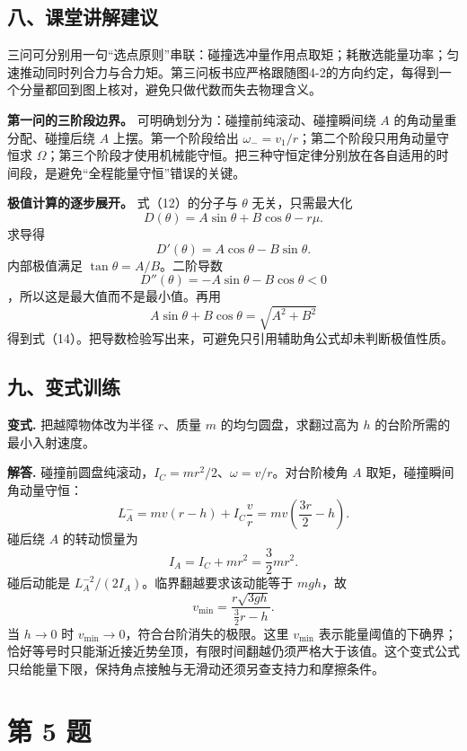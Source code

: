 \documentclass[12pt,a4paper,UTF8]{ctexart}
\begin{document}
\subsection{八、课堂讲解建议}\label{ux516bux8bfeux5802ux8bb2ux89e3ux5efaux8bae-3}

三问可分别用一句``选点原则''串联：碰撞选冲量作用点取矩；耗散选能量功率；匀速推动同时列合力与合力矩。第三问板书应严格跟随图4-2的方向约定，每得到一个分量都回到图上核对，避免只做代数而失去物理含义。

\textbf{第一问的三阶段边界。} 可明确划分为：碰撞前纯滚动、碰撞瞬间绕
\(A\) 的角动量重分配、碰撞后绕 \(A\) 上摆。第一个阶段给出
\(\omega_-=v_1/r\)；第二个阶段只用角动量守恒求
\(\Omega\)；第三个阶段才使用机械能守恒。把三种守恒定律分别放在各自适用的时间段，是避免``全程能量守恒''错误的关键。

\textbf{极值计算的逐步展开。} 式（12）的分子与 \(\theta\)
无关，只需最大化 \[
D(\theta)=A\sin\theta+B\cos\theta-r\mu.
\] 求导得 \[
D'(\theta)=A\cos\theta-B\sin\theta.
\] 内部极值满足 \(\tan\theta=A/B\)。二阶导数 \[
D''(\theta)=-A\sin\theta-B\cos\theta<0
\] ，所以这是最大值而不是最小值。再用 \[
A\sin\theta+B\cos\theta
=\sqrt{A^2+B^2}
\]
得到式（14）。把导数检验写出来，可避免只引用辅助角公式却未判断极值性质。

\subsection{九、变式训练}\label{ux4e5dux53d8ux5f0fux8badux7ec3-3}

\textbf{变式.} 把越障物体改为半径 \(r\)、质量 \(m\)
的均匀圆盘，求翻过高为 \(h\) 的台阶所需的最小入射速度。

\textbf{解答.}
碰撞前圆盘纯滚动，\(I_C=mr^2/2\)、\(\omega=v/r\)。对台阶棱角 \(A\)
取矩，碰撞瞬间角动量守恒： \[
L_A^-=mv(r-h)+I_C\frac vr
=mv\left(\frac{3r}{2}-h\right).
\] 碰后绕 \(A\) 的转动惯量为 \[
I_A=I_C+mr^2=\frac32mr^2.
\] 碰后动能是 \(L_A^{-2}/(2I_A)\)。临界翻越要求该动能等于 \(mgh\)，故 \[
\boxed{v_{\min}=
\frac{r\sqrt{3gh}}{\frac32r-h}}.
\] 当 \(h\to0\) 时 \(v_{\min}\to0\)，符合台阶消失的极限。这里
\(v_{\min}\)
表示能量阈值的下确界；恰好等号时只能渐近接近势垒顶，有限时间翻越仍须严格大于该值。这个变式公式只给能量下限，保持角点接触与无滑动还须另查支持力和摩擦条件。

\newpage

\section{第 5 题}\label{ux7b2c-5-ux9898}
\end{document}
